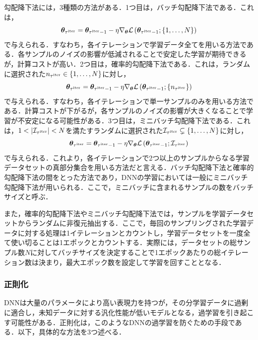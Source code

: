勾配降下法には，3種類の方法がある\cite{zhang2019gradient}．1つ目は，バッチ勾配降下法である．これは，
\begin{equation}
    \bm{\theta}_{\tau^{\text{iter}}} = \bm{\theta}_{\tau^{\text{iter}} - 1} - \eta \nabla_{\bm{\theta}} \mathcal{L}\left(\bm{\theta}_{\tau^{\text{iter}} - 1}; \{1, \ldots, N\}\right)
\end{equation}
で与えられる．すなわち，各イテレーションで学習データ全てを用いる方法である．各サンプルのノイズの影響が低減されることで安定した学習が期待できるが，計算コストが高い．2つ目は，確率的勾配降下法である．これは，ランダムに選択された$n_{\tau^{\text{iter}}} \in \{1, \ldots, N\}$に対し，
\begin{equation}
    \bm{\theta}_{\tau^{\text{iter}}} = \bm{\theta}_{\tau^{\text{iter}} - 1} - \eta \nabla_{\bm{\theta}} \mathcal{L}\left(\bm{\theta}_{\tau^{\text{iter}} - 1}; \{n_{\tau^{\text{iter}}}\}\right)
\end{equation}
で与えられる．すなわち，各イテレーションで単一サンプルのみを用いる方法である．計算コストが下がるが，各サンプルのノイズの影響が大きくなることで学習が不安定になる可能性がある．3つ目は，ミニバッチ勾配降下法である．これは，$1 < |\mathcal{I}_{\tau^{\text{iter}}}| < N$を満たすランダムに選択された$\mathcal{I}_{\tau^{\text{iter}}} \subsetneq \{1, \ldots, N\}$に対し，
\begin{equation}
    \bm{\theta}_{\tau^{\text{iter}}} = \bm{\theta}_{\tau^{\text{iter}} - 1} - \eta \nabla_{\bm{\theta}} \mathcal{L}\left(\bm{\theta}_{\tau^{\text{iter}} - 1}; \mathcal{I}_{\tau^{\text{iter}}}\right)
\end{equation}
で与えられる．これより，各イテレーションで2つ以上のサンプルからなる学習データセットの真部分集合を用いる方法だと言える．バッチ勾配降下法と確率的勾配降下法の間をとった方法であり，DNNの学習においては一般にミニバッチ勾配降下法が用いられる．ここで，ミニバッチに含まれるサンプルの数をバッチサイズと呼ぶ．

また，確率的勾配降下法やミニバッチ勾配降下法では，サンプルを学習データセットからランダムに非復元抽出する．ここで，毎回のサンプリングされた学習データに対する処理は1イテレーションとカウントし，学習データセットを一度全て使い切ることは1エポックとカウントする．実際には，データセットの総サンプル数$N$に対してバッチサイズを決定することで1エポックあたりの総イテレーション数は決まり，最大エポック数を設定して学習を回すこととなる．

\subsubsection{正則化}
DNNは大量のパラメータにより高い表現力を持つが，その分学習データに過剰に適合し，未知データに対する汎化性能が低いモデルとなる，過学習を引き起こす可能性がある．正則化は，このようなDNNの過学習を防ぐための手段である．以下，具体的な方法を3つ述べる．

